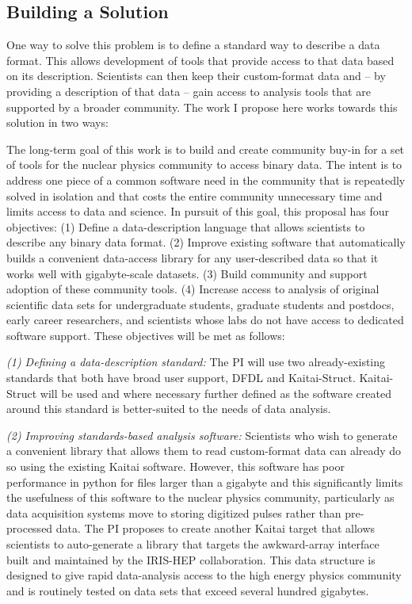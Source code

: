 \subsection{Building a Solution}
One way to solve this problem is to define a standard way to describe a data format.  This allows development of tools that provide access to that data based on its description.  Scientists can then keep their custom-format data and – by providing a description of that data – gain access to analysis tools that are supported by a broader community.  The work I propose here works towards this solution in two ways:

The long-term goal of this work is to build and create community buy-in for a set of tools for the nuclear physics community to access binary data.  The intent is to address one piece of a common software need in the community that is repeatedly solved in isolation and that costs the entire community unnecessary time and limits access to data and science. In pursuit of this goal, this proposal has four objectives:  
(1) Define a data-description language that allows scientists to describe any binary data format.
(2) Improve existing software that automatically builds a convenient data-access library for any user-described data so that it works well with gigabyte-scale datasets.
(3) Build community and support adoption of these community tools.
(4) Increase access to analysis of original scientific data sets for undergraduate students, graduate students and postdocs, early career researchers, and scientists whose labs do not have access to dedicated software support. 
These objectives will be met as follows:

{\it (1) Defining a data-description standard:} The PI will use two already-existing standards that both have broad user support, DFDL and Kaitai-Struct.  Kaitai-Struct will be used and where necessary further defined as the software created around this standard is better-suited to the needs of data analysis.

{\it (2) Improving standards-based analysis software:} Scientists who wish to generate a convenient library that allows them to read custom-format data can already do so using the existing Kaitai software.  However, this software has poor performance in python for files larger than a gigabyte and this significantly limits the usefulness of this software to the nuclear physics community, particularly as data acquisition systems move to storing digitized pulses rather than pre-processed data.  The PI proposes to create another Kaitai target that allows scientists to auto-generate a library that targets the awkward-array interface built and maintained by the IRIS-HEP collaboration.  This data structure is designed to give rapid data-analysis access to the high energy physics community and is routinely tested on data sets that exceed several hundred gigabytes.

